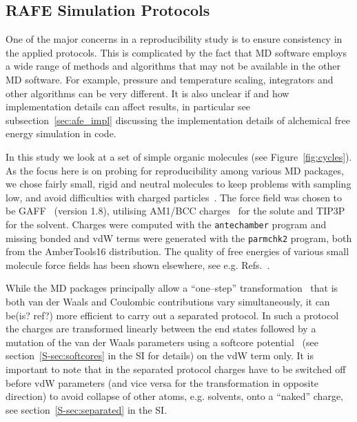 \documentclass[journal=jctcce,manuscript=article]{achemso}
\newcommand{\progname}[1]{\texttt{#1}}
\begin{document}
\subsection{RAFE Simulation Protocols}
\label{sec:rafe_protocols}

One of the major concerns in a reproducibility study is to ensure
consistency in the applied protocols.  This is complicated by the fact
that MD software employs a wide range of methods and algorithms that
may not be available in the other MD software.  For example, pressure and
temperature scaling, integrators and other algorithms can be very
different.  It is also unclear if and how implementation details can
affect results, in particular see subsection~\ref{sec:afe_impl} discussing the 
implementation details of alchemical free energy simulation in code.

In this study we look at a set of simple organic molecules (see
Figure~\ref{fig:cycles}).  As the focus here is on probing for
reproducibility among various MD packages, we chose fairly small,
rigid and neutral molecules to keep problems with sampling low, and
avoid difficulties with charged
particles~\cite{rocklin_calculating_2013, JCC:JCC1050}.  The force
field was chosen to be GAFF~\cite{wang_development_2004} (version
1.8), utilising AM1/BCC charges~\cite{jakalian_fast_2000,
  jakalian_fast_2002} for the solute and
TIP3P~\cite{jorgensen_comparison_1983-1} for the solvent.  Charges were 
computed with the \progname{antechamber} program and missing bonded and vdW 
terms were generated with the \progname{parmchk2} program, both from the 
AmberTools16 distribution.  The quality of free energies of various small 
molecule force fields has been shown
elsewhere, see e.g. Refs.~.

While the MD packages principally allow a ``one--step'' 
transformation~\cite{steinbrecher_soft-core_2011}
that is both van der Waals and Coulombic contributions vary
simultaneously, it can be(is? ref?) more efficient to carry out a
separated protocol.  In such a protocol the charges are transformed
linearly between the end states followed by a mutation of the van der
Waals parameters using a softcore
potential~\cite{beutler_avoiding_1994,
  zacharias_separationshifted_1994} (see section~\ref{S-sec:softcores} in the SI for details) on the vdW
term only.  It is important to note that in the separated protocol
charges have to be switched off before vdW parameters (and vice versa
for the transformation in opposite direction) to avoid collapse of
other atoms, e.g. solvents, onto a ``naked'' charge, see 
section~\ref{S-sec:separated} in the SI.
\end{document}
